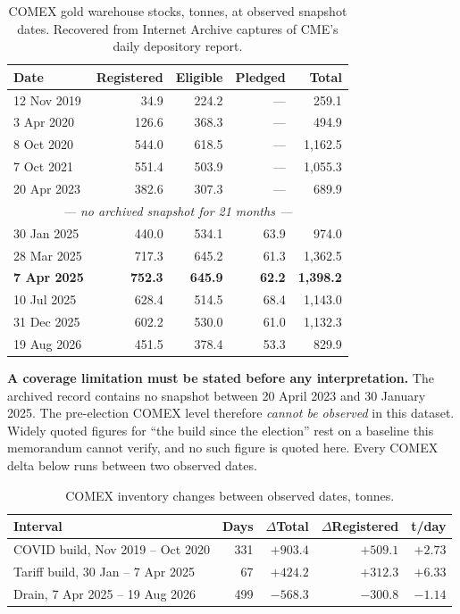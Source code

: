 \documentclass[11pt,a4paper]{article}
\begin{document}
\begin{table}[h]
\centering
\begin{tabular}{@{}lrrrr@{}}
\toprule
\textbf{Date} & \textbf{Registered} & \textbf{Eligible} & \textbf{Pledged} & \textbf{Total} \\
\midrule
12 Nov 2019 & 34.9 & 224.2 & --- & 259.1 \\
3 Apr 2020 & 126.6 & 368.3 & --- & 494.9 \\
8 Oct 2020 & 544.0 & 618.5 & --- & 1{,}162.5 \\
7 Oct 2021 & 551.4 & 503.9 & --- & 1{,}055.3 \\
20 Apr 2023 & 382.6 & 307.3 & --- & 689.9 \\
\multicolumn{5}{c}{\emph{--- no archived snapshot for 21 months ---}} \\
30 Jan 2025 & 440.0 & 534.1 & 63.9 & 974.0 \\
28 Mar 2025 & 717.3 & 645.2 & 61.3 & 1{,}362.5 \\
\textbf{7 Apr 2025} & \textbf{752.3} & \textbf{645.9} & \textbf{62.2} & \textbf{1{,}398.2} \\
10 Jul 2025 & 628.4 & 514.5 & 68.4 & 1{,}143.0 \\
31 Dec 2025 & 602.2 & 530.0 & 61.0 & 1{,}132.3 \\
19 Aug 2026 & 451.5 & 378.4 & 53.3 & 829.9 \\
\bottomrule
\end{tabular}
\caption{COMEX gold warehouse stocks, tonnes, at observed snapshot dates. Recovered from
Internet Archive captures of CME's daily depository report.}
\label{tab:comex}
\end{table}

\textbf{A coverage limitation must be stated before any interpretation.} The archived record
contains no snapshot between 20 April 2023 and 30 January 2025. The pre-election COMEX level
therefore \emph{cannot be observed} in this dataset. Widely quoted figures for ``the build
since the election'' rest on a baseline this memorandum cannot verify, and no such figure is
quoted here. Every COMEX delta below runs between two observed dates.

\begin{table}[h]
\centering
\begin{tabular}{@{}lrrrr@{}}
\toprule
\textbf{Interval} & \textbf{Days} & \textbf{$\Delta$Total} & \textbf{$\Delta$Registered} &
\textbf{t/day} \\
\midrule
COVID build, Nov 2019 -- Oct 2020 & 331 & $+903.4$ & $+509.1$ & $+2.73$ \\
Tariff build, 30 Jan -- 7 Apr 2025 & 67 & $+424.2$ & $+312.3$ & \textbf{$+6.33$} \\
Drain, 7 Apr 2025 -- 19 Aug 2026 & 499 & $-568.3$ & $-300.8$ & $-1.14$ \\
\bottomrule
\end{tabular}
\caption{COMEX inventory changes between observed dates, tonnes.}
\end{table}
\end{document}
